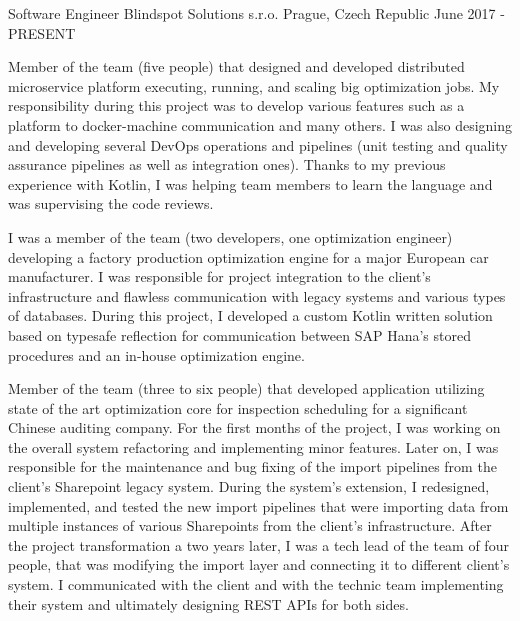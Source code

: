 
\begin{cventries}
		
	\cventry
	{Software Engineer}
	{Blindspot Solutions s.r.o.}
	{Prague, Czech Republic}
	{June 2017 - PRESENT}
	{
		\begin{cvitems}
			\setlength\itemsep{8pt}
			\item {
				Member of the team (five people) that designed and developed distributed microservice platform executing, running, and scaling big optimization jobs. 
			 	\newline
			 	My responsibility during this project was to develop various features such as a platform to docker-machine communication and many others.
				I was also designing and developing several DevOps operations and pipelines 
				(unit testing and quality assurance pipelines as well as integration ones).
				Thanks to my previous experience with Kotlin, I was helping team members to learn the language and was supervising the code reviews.
			}
			\item {
				I was a member of the team (two developers, one optimization engineer) developing a factory production optimization engine
				for a major European car manufacturer. 
				\newline
				I was responsible for project integration to the client's infrastructure and flawless communication with legacy systems 
				and various types of databases.
				During this project, I developed a custom Kotlin written solution based on typesafe reflection for communication
				between SAP Hana's stored procedures and an in-house optimization engine.
			}
			\item {
				Member of the team (three to six people) that developed application utilizing state of the art optimization core 
				for inspection scheduling for a significant Chinese auditing company. 
				\newline
				For the first months of the project, I was working on the overall system refactoring and implementing minor features.
				Later on, I was responsible for the maintenance and bug fixing of the import pipelines from the client's Sharepoint legacy system.
				During the system's extension, I redesigned, implemented, and tested the new import pipelines that were importing data 
				from multiple instances of various Sharepoints from the client's infrastructure.
				\newline
				After the project transformation a two years later, I was a tech lead of the team of four people, 
				that was modifying the import layer and connecting it to different client's system. 
				I communicated with the client and with the technic team implementing their system and ultimately designing REST APIs for both sides.
			}
		\end{cvitems}
	}
	

\end{cventries}
